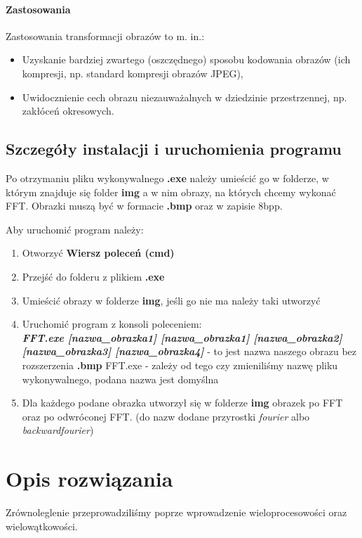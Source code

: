 \paragraph{Zastosowania} Zastosowania transformacji obrazów to m. in.:
\begin{itemize}
	\item Uzyskanie bardziej zwartego (oszczędnego) sposobu kodowania obrazów
	(ich kompresji, np. standard kompresji obrazów JPEG),
	\item Uwidocznienie cech obrazu niezauważalnych w dziedzinie przestrzennej,
	np. zakłóceń okresowych.
\end{itemize}
\subsection{Szczegóły instalacji i uruchomienia programu} 
Po otrzymaniu pliku wykonywalnego \textbf{.exe} należy umieścić go w folderze, w którym znajduje się folder \textbf{img} a w nim obrazy, na których chcemy wykonać FFT. Obrazki muszą być w formacie \textbf{.bmp} oraz w zapisie 8bpp. 

Aby uruchomić program należy:
\begin{enumerate}
	\item Otworzyć \textbf{Wiersz poleceń (cmd)}
	\item Przejść do folderu z plikiem \textbf{.exe}
	\item Umieścić obrazy w folderze \textbf{img}, jeśli go nie ma należy taki utworzyć
	\item Uruchomić program z konsoli poleceniem:\\
	\textbf{\textit{FFT.exe [nazwa\_obrazka1] [nazwa\_obrazka1] [nazwa\_obrazka2] [nazwa\_obrazka3] [nazwa\_obrazka4]}}
	 - to jest nazwa naszego obrazu bez rozszerzenia \textbf{.bmp}
	\subitem FFT.exe - zależy od tego czy zmieniliśmy nazwę pliku wykonywalnego, podana nazwa jest domyślna
	\item Dla każdego podane obrazka utworzył się w folderze \textbf{img} obrazek po FFT oraz po odwróconej FFT. (do nazw dodane przyrostki \textit{fourier} albo \textit{backwardfourier})
\end{enumerate} 
\section{Opis rozwiązania}

Zrównoleglenie przeprowadziliśmy poprze wprowadzenie wieloprocesowości oraz wielowątkowości.
